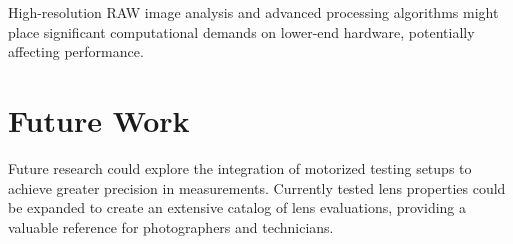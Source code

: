 High-resolution RAW image analysis and advanced processing algorithms might place significant computational demands on lower-end hardware, potentially affecting performance.

\section{Future Work}

Future research could explore the integration of motorized testing setups to achieve greater precision in measurements. Currently tested lens properties could be expanded to create an extensive catalog of lens evaluations, providing a valuable reference for photographers and technicians.